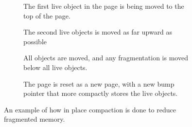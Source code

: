 \begin{figure}[H]
    \centering
    \begin{subfigure}[t]{.2\textwidth}
        \centering
        
        \caption{The first live object in the page is being moved to the top of the page.}
        \label{fig:zrel_in1}
    \end{subfigure}%
    \hfill\vline\hfill
    \begin{subfigure}[t]{.2\textwidth}
        \centering
        
        \caption{The second live objects is moved as far upward as possible}
        \label{fig:zrel_in1}
    \end{subfigure}%
    \hfill\vline\hfill
    \begin{subfigure}[t]{.2\textwidth}
        \centering
        
        \caption{All objects are moved, and any fragmentation is moved below all live objects.}
        \label{fig:zrel_in1}
    \end{subfigure}%
    \hfill\vline\hfill
    \begin{subfigure}[t]{.2\textwidth}
        \centering
        
        \caption{The page is reset as a new page, with a new bump pointer that more compactly stores the live objects.}
        \label{fig:zrel_in1}
    \end{subfigure}%
    \caption{An example of how in place compaction is done to reduce fragmented memory.}
    \label{fig:zrel_in}
\end{figure}
 
